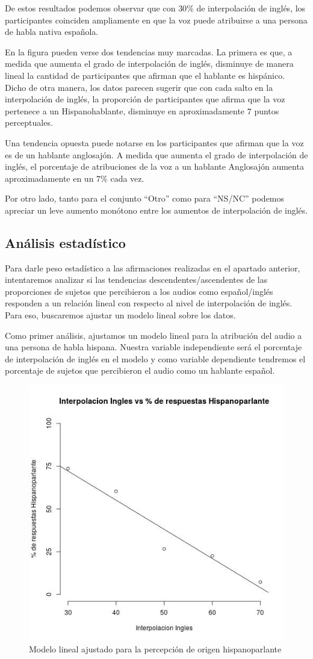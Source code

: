 De estos resultados podemos observar que con $30\%$ de interpolación de inglés, los participantes coinciden ampliamente en que la voz puede atribuirse a una persona de habla nativa española.

En la figura pueden verse dos tendencias muy marcadas. La primera es que, a medida que aumenta el grado de interpolación de inglés, disminuye de manera lineal la cantidad de participantes que afirman que el hablante es hispánico. Dicho de otra manera, los datos parecen sugerir que con cada salto en la interpolación de inglés, la proporción de participantes que afirma que la voz pertenece a un Hispanohablante, disminuye en aproximadamente $7$ puntos perceptuales. 

Una tendencia opuesta puede notarse en los participantes que afirman que la voz es de un hablante anglosajón. A medida que aumenta el grado de interpolación de inglés, el porcentaje de atribuciones de la voz a un hablante Anglosajón aumenta aproximadamente en un $7\%$ cada vez.

Por otro lado, tanto para el conjunto ``Otro'' como para ``NS/NC'' podemos apreciar un leve aumento monótono entre los aumentos de interpolación de inglés.

\subsection{Análisis estadístico}

Para darle peso estadístico a las afirmaciones realizadas en el apartado anterior, intentaremos analizar si las tendencias descendentes/ascendentes de las proporciones de sujetos que percibieron a los audios como español/inglés responden a un relación lineal con respecto al nivel de interpolación de inglés. Para eso, buscaremos ajustar un modelo lineal sobre los datos.

Como primer análisis, ajustamos un modelo lineal para la atribución del audio a una persona de habla hispana. Nuestra variable independiente será el porcentaje de interpolación de inglés en el modelo y como variable dependiente tendremos el porcentaje de sujetos que percibieron el audio como un hablante español.

\begin{figure}
\begin{center}
\includegraphics[trim={0 0 0 1.5cm},clip,width=.5\textwidth]{imagenes/estadistica/spanish.jpg}
\end{center}
\caption{Modelo lineal ajustado para la percepción de origen hispanoparlante}
\label{stadisticSpanish}
\end{figure}

